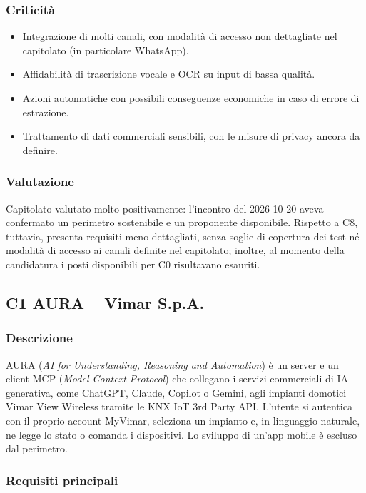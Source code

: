 \subsubsection*{Criticità}

\begin{itemize}
    \item Integrazione di molti canali, con modalità di accesso non dettagliate nel capitolato (in particolare WhatsApp).
    \item Affidabilità di trascrizione vocale e OCR su input di bassa qualità.
    \item Azioni automatiche con possibili conseguenze economiche in caso di errore di estrazione.
    \item Trattamento di dati commerciali sensibili, con le misure di privacy ancora da definire.
\end{itemize}

\subsubsection*{Valutazione}

Capitolato valutato molto positivamente: l'incontro del 2026-10-20 aveva confermato un perimetro sostenibile e un proponente disponibile. Rispetto a C8, tuttavia, presenta requisiti meno dettagliati, senza soglie di copertura dei test né modalità di accesso ai canali definite nel capitolato; inoltre, al momento della candidatura i posti disponibili per C0 risultavano esauriti.

\subsection{C1 AURA -- Vimar S.p.A.}

\subsubsection*{Descrizione}

AURA (\emph{AI for Understanding, Reasoning and Automation}) è un server e un client MCP (\emph{Model Context Protocol}) che collegano i servizi commerciali di IA generativa, come ChatGPT, Claude, Copilot o Gemini, agli impianti domotici Vimar View Wireless tramite le KNX IoT 3rd Party API. L'utente si autentica con il proprio account MyVimar, seleziona un impianto e, in linguaggio naturale, ne legge lo stato o comanda i dispositivi. Lo sviluppo di un'app mobile è escluso dal perimetro.

\subsubsection*{Requisiti principali}

